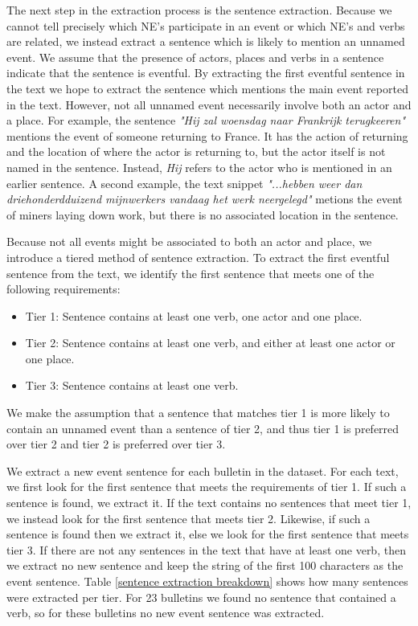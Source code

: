 \documentclass[a4paper, 10pt, conference]{ieeeconf}      %
\begin{document}
The next step in the extraction process is the sentence extraction. Because we cannot tell precisely which NE's participate in an event or which NE's and verbs are related, we instead extract a sentence which is likely to mention an unnamed event. We assume that the presence of actors, places and verbs in a sentence indicate that the sentence is eventful. By extracting the first eventful sentence in the text we hope to extract the sentence which mentions the main event reported in the text. However, not all unnamed event necessarily involve both an actor and a place. For example, the sentence \textit{"Hij zal woensdag naar Frankrijk terugkeeren"} mentions the event of someone returning to France. It has the action of returning and the location of where the actor is returning to, but the actor itself is not named in the sentence. Instead, \textit{Hij} refers to the actor who is mentioned in an earlier sentence. A second example, the text snippet \textit{"...hebben weer dan driehonderdduizend mijnwerkers vandaag het werk neergelegd"} metions the event of miners laying down work, but there is no associated location in the sentence.

Because not all events might be associated to both an actor and place, we introduce a tiered method of sentence extraction. To extract the first eventful sentence from the text, we identify the first sentence that meets one of the following requirements:

\begin{itemize}
\item Tier 1: Sentence contains at least one verb, one actor and one place.
\item Tier 2: Sentence contains at least one verb, and either at least one actor or one place. 
\item Tier 3: Sentence contains at least one verb.
\end{itemize}
We make the assumption that a sentence that matches tier 1 is more likely to contain an unnamed event than a sentence of tier 2, and thus tier 1 is preferred over tier 2 and tier 2 is preferred over tier 3.

We extract a new event sentence for each bulletin in the dataset. For each text, we first look for the first sentence that meets the requirements of tier 1. If such a sentence is found, we extract it. If the text contains no sentences that meet tier 1, we instead look for the first sentence that meets tier 2. Likewise, if such a sentence is found then we extract it, else we look for the first sentence that meets tier 3. If there are not any sentences in the text that have at least one verb, then we extract no new sentence and keep the string of the first 100 characters as the event sentence. Table \ref{sentence extraction breakdown} shows how many sentences were extracted per tier. For 23 bulletins we found no sentence that contained a verb, so for these bulletins no new event sentence was extracted. 
\end{document}
